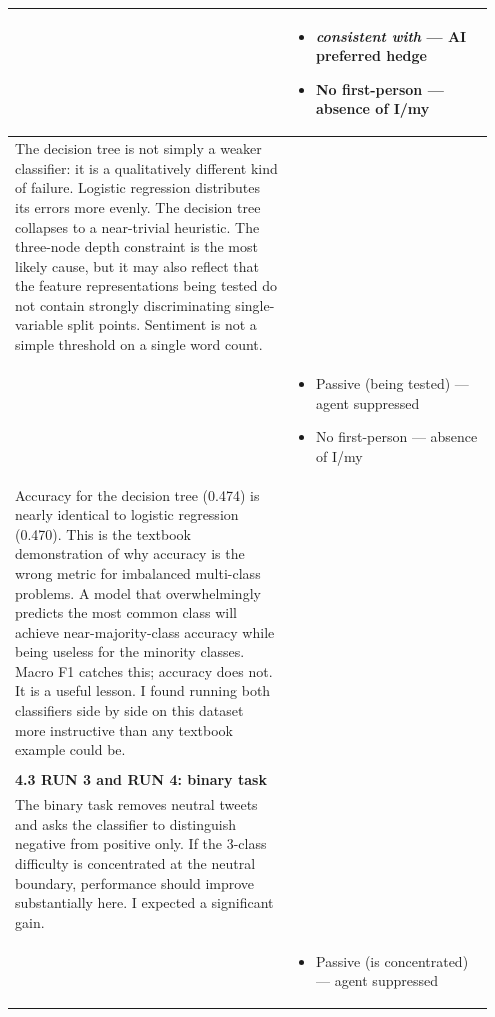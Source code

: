 \documentclass[11pt]{article}
\begin{document}
\begin{longtable}{|p{0.55\linewidth}|p{0.40\linewidth}|}
\hline
\rule[-3.5cm]{0pt}{3.5cm} & \begin{itemize}[leftmargin=1em,itemsep=1pt,topsep=1pt,parsep=0pt]
  \item \textit{consistent with} --- AI preferred hedge
  \item No first-person --- absence of I/my
\end{itemize} \\
\hline
The decision tree is not simply a weaker classifier: it is a qualitatively different kind of failure. Logistic regression distributes its errors more evenly. The decision tree collapses to a near-trivial heuristic. The three-node depth constraint is the most likely cause, but it may also reflect that the feature representations being tested do not contain strongly discriminating single-variable split points. Sentiment is not a simple threshold on a single word count. & \\[2pt]
\hline
\rule[-3.5cm]{0pt}{3.5cm} & \begin{itemize}[leftmargin=1em,itemsep=1pt,topsep=1pt,parsep=0pt]
  \item Passive (being tested) --- agent suppressed
  \item No first-person --- absence of I/my
\end{itemize} \\
\hline
Accuracy for the decision tree (0.474) is nearly identical to logistic regression (0.470). This is the textbook demonstration of why accuracy is the wrong metric for imbalanced multi-class problems. A model that overwhelmingly predicts the most common class will achieve near-majority-class accuracy while being useless for the minority classes. Macro F1 catches this; accuracy does not. It is a useful lesson. I found running both classifiers side by side on this dataset more instructive than any textbook example could be. & \\[2pt]
\hline
\rule[-3.5cm]{0pt}{3.5cm} &  \\
\hline
\textbf{4.3 RUN 3 and RUN 4: binary task}\\[4pt]
The binary task removes neutral tweets and asks the classifier to distinguish negative from positive only. If the 3-class difficulty is concentrated at the neutral boundary, performance should improve substantially here. I expected a significant gain. & \\[2pt]
\hline
\rule[-3.5cm]{0pt}{3.5cm} & \begin{itemize}[leftmargin=1em,itemsep=1pt,topsep=1pt,parsep=0pt]
  \item Passive (is concentrated) --- agent suppressed

\end{itemize}
\end{longtable}
\end{document}
